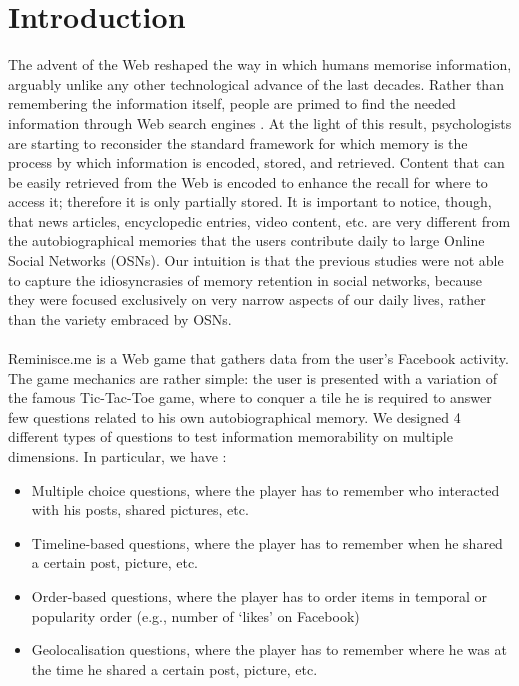 \chapter*{Introduction}
The advent of the Web reshaped the way in which humans memorise information, arguably unlike any other technological advance of the last decades. Rather than remembering the information itself, people are primed to find the needed information through Web search engines \cite{googlemem} . At the light of this result, psychologists are starting to reconsider the standard framework for which memory is the process by which information is encoded, stored, and retrieved. Content that can be easily retrieved from the Web is encoded to enhance the recall for where to access it; therefore it is only partially stored. It is important to notice, though, that news articles, encyclopedic entries, video content, etc. are very different from the autobiographical memories that the users contribute daily to large Online Social Networks (OSNs). Our intuition is that the previous studies \cite{retenauto} \cite{howhappy} were not able to capture the idiosyncrasies of memory retention in social networks, because they were focused exclusively on very narrow aspects of our daily lives, rather than the variety embraced by OSNs.\\\\
Reminisce.me is a Web game that gathers data from the user’s Facebook activity. The game mechanics are rather simple: the user is presented with a variation of the famous Tic-Tac-Toe game, where to conquer a tile he is required to answer few questions related to his own autobiographical memory. We designed 4 different types of questions to test information memorability on multiple
dimensions. In particular, we have :
\begin{itemize}
	\item Multiple choice questions, where the player has to remember who interacted with his posts, shared pictures, etc.
	\item Timeline-based questions, where the player has to remember when he shared a certain post, picture, etc.
	\item Order-based questions, where the player has to order items in temporal or popularity order (e.g., number of `likes' on Facebook)
	\item Geolocalisation questions, where the player has to remember where he was at the time he shared a certain post, picture, etc.
\end{itemize}
